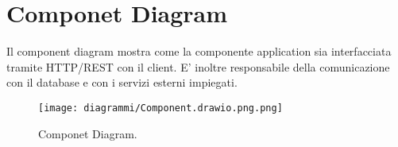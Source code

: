 \section{Componet Diagram} 
Il component diagram mostra come la componente application sia interfacciata tramite HTTP/REST con il client. E' inoltre responsabile 
della comunicazione con il database e con i servizi esterni impiegati.
\begin{figure}[h!]
	\centering
	\texttt{[image: diagrammi/Component.drawio.png.png]}
	\caption{Componet Diagram.}
	\label{fig:ComponentDiagram}
\end{figure}
